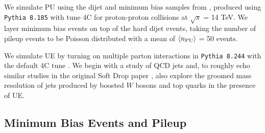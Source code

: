 We simulate PU using the dijet and minimum bias samples from , produced using \texttt{Pythia 8.185} with tune 4C for proton-proton collisions at \(\sqrt{s}\) = 14 TeV.
%
We layer minimum bias events on top of the hard dijet events, taking the number of pileup events to be Poisson distributed with a mean of \(\langle n_{\rm PU}\rangle\) = 50 events.

We simulate UE by turning on multiple parton interactions in \texttt{Pythia 8.244} \cite{Sjostrand:2014zea} with the default 4C tune \cite{Corke:2010yf}.
%
We begin with a study of QCD jets and, to roughly echo similar studies in the original Soft Drop paper \cite{Larkoski:2014wba}, also explore the groomed mass resolution of jets produced by boosted \(W\) bosons and top quarks in the presence of UE.


\subsection{Minimum Bias Events and Pileup}
\label{sec:pileup}


